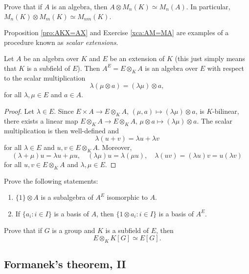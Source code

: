 \begin{exercise}
\label{xca:AM=MA}
	Prove that if $A$ is an algebra, then $A\otimes M_n(K)\simeq M_n(A)$. In
	particular, $M_n(K)\otimes M_m(K)\simeq M_{nm}(K)$.
\end{exercise}

Proposition \ref{pro:AKX=AX} and Exercise \ref{xca:AM=MA} 
are examples of a procedure known as \emph{scalar extensions}. 

\begin{theorem}
\label{thm:extensions_scalars}
	Let $A$ be an algebra over $K$ and $E$ be an extension of $K$ (this just simply means that
	$K$ is a subfield of $E$). Then 
	$A^E=E\otimes_KA$ is an algebra over $E$ with respect to
	the scalar multiplication 
	\[
		\lambda(\mu\otimes a)=(\lambda\mu)\otimes a,
	\]
	for all $\lambda,\mu\in E$ and $a\in A$.
\end{theorem}

\begin{proof}
	Let $\lambda\in E$. Since $E\times A\to E\otimes_KA$,
	$(\mu,a)\mapsto (\lambda\mu)\otimes a$, is $K$-bilinear, there exists 
	a linear map $E\otimes_KA\to E\otimes_KA$, $\mu\otimes a\mapsto
	(\lambda\mu)\otimes a$. The scalar multiplication is then well-defined and 
	\[
	\lambda(u+v)=\lambda u+\lambda v
	\]
	for all $\lambda\in E$ and $u,v\in E\otimes_KA$. Moreover, 
	\[
	(\lambda+\mu)u=\lambda u+\mu u,
	\quad
	(\lambda\mu)u=\lambda(\mu u),
	\quad
	\lambda(uv)=(\lambda u)v=u(\lambda v)
	\]
	for all $u,v\in E\otimes_KA$ and $\lambda,\mu\in E$.
\end{proof}

\begin{exercise}
    Prove the following statements:
    \begin{enumerate}
		\item $\{1\}\otimes A$ is a subalgebra of $A^E$ isomorphic to $A$.
		\item If $\{a_i:i\in I\}$ is a basis of $A$, then $\{1\otimes a_i:i\in
			I\}$ is a basis of $A^E$.
	\end{enumerate}
\end{exercise}

\begin{exercise}
	Prove that if $G$ is a group and $K$ is a subfield of $E$, then
	\[
	E\otimes_K K[G]\simeq E[G].
	\]
\end{exercise}

\subsection{Formanek's theorem, II}

